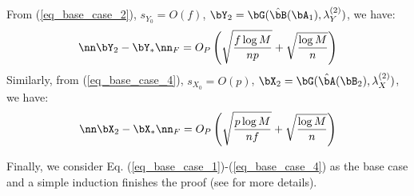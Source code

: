 \begin{IEEEproof}
From (\ref{eq_base_case_2}), $s_{Y_0}=O(f)$, $\bY_2 = \bG(\hat{\bB}(\bA_1),\lambda_Y^{(2)})$, we have:
\begin{equation*}
	\nn \bY_2 - \bY_* \nn_F = O_P\left( \sqrt{\frac{f\log M}{np}} + \sqrt{\frac{\log M}{n}} \right)
\end{equation*}
Similarly, from (\ref{eq_base_case_4}), $s_{X_0}=O(p)$, $\bX_2 = \bG(\hat{\bA}(\bB_2),\lambda_X^{(2)})$, we have:
\begin{equation*}
	\nn \bX_2 - \bX_* \nn_F = O_P\left( \sqrt{\frac{p\log M}{nf}} + \sqrt{\frac{\log M}{n}} \right)
\end{equation*}

Finally, we consider Eq. (\ref{eq_base_case_1})-(\ref{eq_base_case_4}) as the base case and a simple induction finishes the proof (see \cite{TsiligkaridisTSP} for more details).


\end{IEEEproof}
